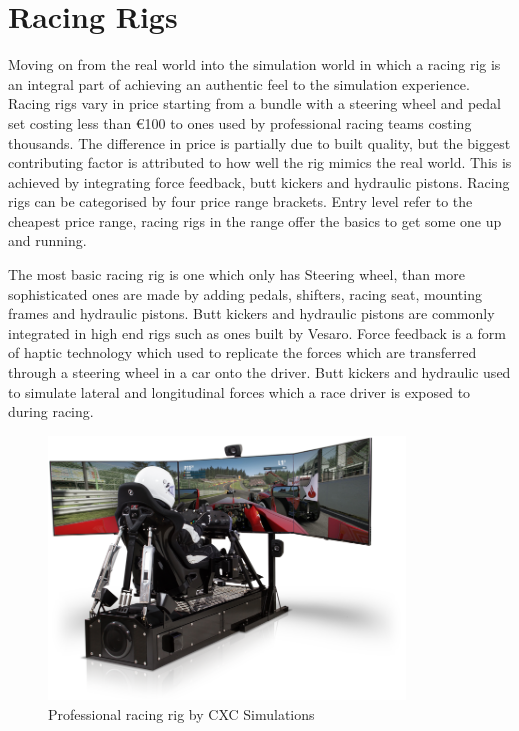 \section{Racing Rigs}

Moving on from the real world into the simulation world in which a racing rig is an integral part of achieving an authentic feel to the simulation experience. Racing rigs vary in price starting from a bundle with a steering wheel and pedal set costing less than €100 to ones used by professional racing teams costing thousands. The difference in price is partially due to built quality, but the biggest contributing factor is attributed to how well the rig mimics the real world. This is achieved by integrating force feedback, butt kickers and hydraulic pistons. Racing rigs can be categorised by four price range brackets. Entry level refer to the cheapest price range, racing rigs in the range offer the basics to get some one up and running.

The most basic racing rig is one which only has Steering wheel, than more sophisticated ones are made by adding pedals, shifters, racing seat, mounting frames and hydraulic pistons. Butt kickers and hydraulic pistons are commonly integrated in high end rigs such as ones built by Vesaro. Force feedback is a form of haptic technology which used to replicate the forces which are transferred through a steering wheel in a car onto the driver\cite{li2015can}. Butt kickers and hydraulic used to simulate lateral and longitudinal forces which a race driver is exposed to during racing.

\begin{figure}[!htb]
	\centering
	\includegraphics[height=7cm]{images/proracingrig.png}
	\caption{Professional racing rig by CXC Simulations}
	\label{fig:slipangle}
\end{figure}







